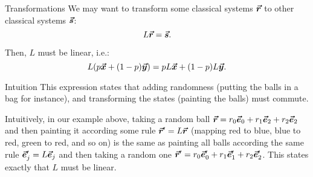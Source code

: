 \documentclass[a4paper]{article}
\begin{document}
\begin{parag}{Transformations}
    We may want to transform some classical systems $\bm{\protect\vec{r}}$ to other classical systems $\bm{\protect\vec{s}}$: 
    \[L \bm{\protect\vec{r}} = \bm{\protect\vec{s}}.\]

    Then, $L$ must be linear, i.e.: 
    \[L \left(p \bvec{x} + \left(1 - p\right)\bvec{y}\right) = p L \bvec{x} + \left(1-p\right) L \bvec{y}.\]

    \begin{subparag}{Intuition}
        This expression states that adding randomness (putting the balls in a bag for instance), and transforming the states (painting the balls) must commute. 

        Intuitively, in our example above, taking a random ball $\bm{\protect\vec{r}} = r_0 \bm{\protect\vec{e}}_0 + r_1 \bm{\protect\vec{e}}_2 + r_2 \bm{\protect\vec{e}}_2$ and then painting it according some rule $\bm{\protect\vec{r}}' = L \bm{\protect\vec{r}}$ (mapping red to blue, blue to red, green to red, and so on) is the same as painting all balls according the same rule $\bm{\protect\vec{e}}_j' = L \bm{\protect\vec{e}}_j$ and then taking a random one $\bm{\protect\vec{r}}' = r_0 \bm{\protect\vec{e}}_0' + r_1 \bm{\protect\vec{e}}_1' + r_2 \bm{\protect\vec{e}}_2'$. This states exactly that $L$ must be linear.
    \end{subparag}
\end{parag}
\end{document}
